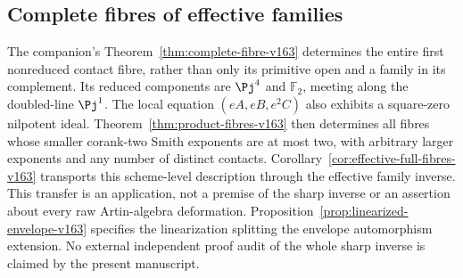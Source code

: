 \subsection{Complete fibres of effective families}
The companion's Theorem~\ref{thm:complete-fibre-v163} determines the
entire first nonreduced contact fibre, rather than only its primitive
open and a family in its complement. Its reduced components are
$\Pj^4$ and $\mathbb F_2$, meeting along the doubled-line
$\Pj^1$. The local equation $(eA,eB,e^2C)$ also exhibits a
square-zero nilpotent ideal. Theorem~\ref{thm:product-fibres-v163}
then determines all fibres whose smaller corank-two Smith exponents
are at most two, with arbitrary larger exponents and any number
of distinct contacts. Corollary~\ref{cor:effective-full-fibres-v163}
transports this scheme-level description through the effective
family inverse. This transfer is an application, not a premise
of the sharp inverse or an assertion about every raw Artin-algebra
deformation. Proposition~\ref{prop:linearized-envelope-v163}
specifies the linearization splitting the envelope automorphism
extension. No external independent proof audit of the whole sharp
inverse is claimed by the present manuscript.

